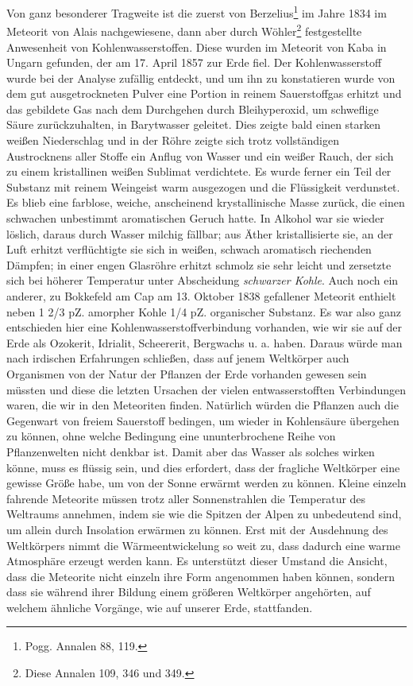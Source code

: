 \documentclass[a4paper, 11pt, oneside, german]{article}
\begin{document}
Von ganz besonderer Tragweite ist die zuerst von Berzelius\footnote{Pogg. Annalen 88, 119.} im Jahre 1834 im Meteorit von Alais nachgewiesene, dann aber durch Wöhler\footnote{Diese Annalen 109, 346 und 349.} festgestellte Anwesenheit von Kohlenwasserstoffen. Diese wurden im Meteorit von Kaba in Ungarn gefunden, der am 17. April 1857 zur Erde fiel. Der Kohlenwasserstoff wurde bei der Analyse zufällig entdeckt, und um ihn zu konstatieren wurde von dem gut ausgetrockneten Pulver eine Portion in reinem Sauerstoffgas erhitzt und das gebildete Gas nach dem Durchgehen durch Bleihyperoxid, um schweflige Säure zurückzuhalten, in Barytwasser geleitet. Dies zeigte bald einen starken weißen Niederschlag und in der Röhre zeigte sich trotz vollständigen Austrocknens aller Stoffe ein Anflug von Wasser und ein weißer Rauch, der sich zu einem kristallinen weißen Sublimat verdichtete. Es wurde ferner ein Teil der Substanz mit reinem Weingeist warm ausgezogen und die Flüssigkeit verdunstet. Es blieb eine farblose, weiche, anscheinend krystallinische Masse zurück, die einen schwachen unbestimmt aromatischen Geruch hatte. In Alkohol war sie wieder löslich, daraus durch Wasser milchig fällbar; aus Äther kristallisierte sie, an der Luft erhitzt verflüchtigte sie sich in weißen, schwach aromatisch riechenden Dämpfen; in einer engen Glasröhre erhitzt schmolz sie sehr leicht und zersetzte sich bei höherer Temperatur unter Abscheidung \emph{schwarzer Kohle}. Auch noch ein anderer, zu Bokkefeld am Cap am 13. Oktober 1838 gefallener Meteorit enthielt neben 1 2/3 pZ. amorpher Kohle 1/4 pZ. organischer Substanz. Es war also ganz entschieden hier eine Kohlenwasserstoffverbindung vorhanden, wie wir sie auf der Erde als Ozokerit, Idrialit, Scheererit, Bergwachs u. a. haben. Daraus würde man nach irdischen Erfahrungen schließen, dass auf jenem Weltkörper auch Organismen von der Natur der Pflanzen der Erde vorhanden gewesen sein müssten und diese die letzten Ursachen der vielen entwasserstofften Verbindungen waren, die wir in den Meteoriten finden. Natürlich würden die Pflanzen auch die Gegenwart von freiem Sauerstoff bedingen, um wieder in Kohlensäure übergehen zu können, ohne welche Bedingung eine ununterbrochene Reihe von Pflanzenwelten nicht denkbar ist. Damit aber das Wasser als solches wirken könne, muss es flüssig sein, und dies erfordert, dass der fragliche Weltkörper eine gewisse Größe habe, um von der Sonne erwärmt werden zu können. Kleine einzeln fahrende Meteorite müssen trotz aller Sonnenstrahlen die Temperatur des Weltraums annehmen, indem sie wie die Spitzen der Alpen zu unbedeutend sind, um allein durch Insolation erwärmen zu können. Erst mit der Ausdehnung des Weltkörpers nimmt die Wärmeentwickelung so weit zu, dass dadurch eine warme Atmosphäre erzeugt werden kann. Es unterstützt dieser Umstand die Ansicht, dass die Meteorite nicht einzeln ihre Form angenommen haben können, sondern dass sie während ihrer Bildung einem größeren Weltkörper angehörten, auf welchem ähnliche Vorgänge, wie auf unserer Erde, stattfanden.
\end{document}
